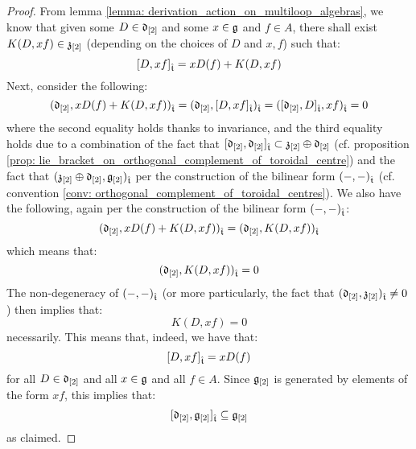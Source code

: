             \begin{proof}
                From lemma \ref{lemma: derivation_action_on_multiloop_algebras}, we know that given some $D \in \mathfrak{d}_{[2]}$ and some $x \in \mathfrak{g}$ and $f \in A$, there shall exist $K(D, xf) \in \mathfrak{z}_{[2]}$ (depending on the choices of $D$ and $x, f$) such that:
                    $$[D, xf]_{\hat{\mathfrak{t}}} = x D(f) + K(D, xf)$$
                Next, consider the following:
                    $$( \mathfrak{d}_{[2]}, x D(f) + K(D, xf) )_{\hat{\mathfrak{t}}} = ( \mathfrak{d}_{[2]}, [D, xf]_{\hat{\mathfrak{t}}} )_{\hat{\mathfrak{t}}} = ( [\mathfrak{d}_{[2]}, D]_{\hat{\mathfrak{t}}}, xf )_{\hat{\mathfrak{t}}} = 0$$
                where the second equality holds thanks to invariance, and the third equality holds due to a combination of the fact that $[\mathfrak{d}_{[2]}, \mathfrak{d}_{[2]}]_{\hat{\mathfrak{t}}} \subset \mathfrak{z}_{[2]} \oplus \mathfrak{d}_{[2]}$ (cf. proposition \ref{prop: lie_bracket_on_orthogonal_complement_of_toroidal_centre}) and the fact that $(\mathfrak{z}_{[2]} \oplus \mathfrak{d}_{[2]}, \mathfrak{g}_{[2]})_{\hat{\mathfrak{t}}}$ per the construction of the bilinear form $(-, -)_{\hat{\mathfrak{t}}}$ (cf. convention \ref{conv: orthogonal_complement_of_toroidal_centres}). We also have the following, again per the construction of the bilinear form $(-, -)_{\hat{\mathfrak{t}}}$:
                    $$( \mathfrak{d}_{[2]}, x D(f) + K(D, xf) )_{\hat{\mathfrak{t}}} = ( \mathfrak{d}_{[2]}, K(D, xf) )_{\hat{\mathfrak{t}}}$$
                which means that:
                    $$( \mathfrak{d}_{[2]}, K(D, xf) )_{\hat{\mathfrak{t}}} = 0$$
                The non-degeneracy of $(-, -)_{\hat{\mathfrak{t}}}$ (or more particularly, the fact that $( \mathfrak{d}_{[2]}, \mathfrak{z}_{[2]} )_{\hat{\mathfrak{t}}} \not = 0$) then implies that:
                    $$K(D, xf) = 0$$
                necessarily. This means that, indeed, we have that:
                    $$[D, xf]_{\hat{\mathfrak{t}}} = x D(f)$$
                for all $D \in \mathfrak{d}_{[2]}$ and all $x \in \mathfrak{g}$ and all $f \in A$. Since $\mathfrak{g}_{[2]}$ is generated by elements of the form $xf$, this implies that:
                    $$[\mathfrak{d}_{[2]}, \mathfrak{g}_{[2]}]_{\hat{\mathfrak{t}}} \subseteq \mathfrak{g}_{[2]}$$
                as claimed. 
            \end{proof}
        
